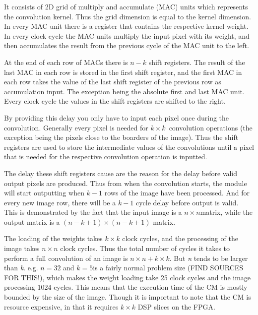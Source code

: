 It consists of 2D grid of multiply and accumulate (MAC) units which represents the convolution kernel. Thus the grid dimension is equal to the kernel dimension. In every MAC unit there is a register that contains the respective kernel weight. In every clock cycle the MAC units multiply the input pixel with its weight, and then accumulates the result from the previous cycle of the MAC unit to the left. 

At the end of each row of MACs there is $ n - k $ shift registers. The result of the last MAC in each row is stored in the first shift register, and the first MAC in each row takes the value of the last shift register of the previous row as accumulation input. The exception being the absolute first and last MAC unit. Every clock cycle the values in the shift registers are shifted to the right. 
	
By providing this delay you only have to input each pixel once during the convolution. Generally every pixel is needed for $ k \times k $ convolution operations (the exception being the pixels close to the boarders of the image). Thus the shift registers are used to store the intermediate values of the convolutions until a pixel that is needed for the respective convolution operation is inputted. 

The delay these shift registers cause are the reason for the delay before valid output pixels are produced. Thus from when the convolution starts, the module will start outputting when $ k-1 $ rows of the image have been processed. And for every new image row, there will be a $ k-1 $ cycle delay before output is valid. This is demonstrated by the fact that the input image is a $ n \times n $matrix, while the output matrix is a $ (n-k+1) \times (n-k+1) $ matrix. 

The loading of the weights takes $ k \times k $ clock cycles, and the processing of the image takes $ n \times n $ clock cycles. Thus the total number of cycles it takes to perform a full convolution of an image is $ n \times n + k \times k $. But \textit{n} tends to be larger than \textit{k}. e.g. $ n = 32 $ and $ k = 5 $is a fairly normal problem size (FIND SOURCES FOR THIS!), which makes the weight loading take 25 clock cycles and the image processing 1024 cycles. This means that the execution time of the CM is mostly bounded by the size of the image. Though it is important to note that the CM is resource expensive, in that it requires $ k \times k $ DSP slices on the FPGA.

